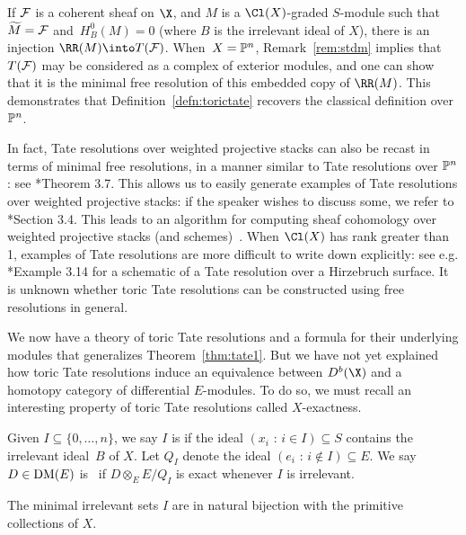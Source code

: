\documentclass{amsart}
\begin{document}
\begin{remark}
  If $\mathcal{F}$ is a coherent sheaf on $\X$, and $M$ is a $\Cl(X)$-graded $S$-module such that $\widetilde{M} = \mathcal{F}$ and~$H^0_B(M) = 0$ (where $B$ is the irrelevant ideal of $X$), there is an injection $\RR(M) \into T(\F)$. When~$X = \mathbb P^n$, Remark~\ref{rem:stdm} implies that $T(\mathcal{F})$ may be considered as a complex of exterior modules, and one can show that it is the minimal free resolution of this embedded copy of $\RR(M)$. This demonstrates that Definition~\ref{defn:torictate} recovers the classical definition over $\mathbb P^n$.

  In fact, Tate resolutions over weighted projective stacks can also be recast in terms of minimal free resolutions, in a manner similar to Tate resolutions over $\mathbb P^n$: see \cite{BE24b}*{Theorem 3.7}. This allows us to easily generate examples of Tate resolutions over weighted projective stacks: if the speaker wishes to discuss some, we refer to \cite{BE24b}*{Section 3.4}. This leads to an algorithm for computing sheaf cohomology over weighted projective stacks (and schemes)~\cite{BE25a}. When $\Cl(X)$ has rank greater than 1, examples of Tate resolutions are more difficult to write down explicitly: see e.g. \cite{BE24b}*{Example 3.14} for a schematic of a Tate resolution over a Hirzebruch surface. It is unknown whether toric Tate resolutions can be constructed using free resolutions in general.
\end{remark}

We now have a theory of toric Tate resolutions and a formula for their underlying modules that generalizes Theorem~\ref{thm:tate1}. But we have not yet explained how toric Tate resolutions induce an equivalence between $D^b(\X)$ and a homotopy category of differential $E$-modules. To do so, we must recall an interesting property of toric Tate resolutions called $X$-exactness.

\begin{defn}\label{defn:exactnessProperties}
Given $I \subseteq \{0, \dots, n\}$, we say $I$ is  if the ideal $(x_i \text{ : } i \in I) \subseteq S$ contains the irrelevant ideal~$B$ of $X$. Let $Q_I$ denote the ideal $(e_i \text{ : } i \notin I) \subseteq E$. We say $D \in \operatorname{DM}(E)$ is~ if $D \otimes_E E/Q_I $ is exact whenever $I$ is irrelevant.
\end{defn}

\begin{remark}
The minimal irrelevant sets $I$ are in natural bijection with the primitive collections of $X$.
\end{remark}
\end{document}
